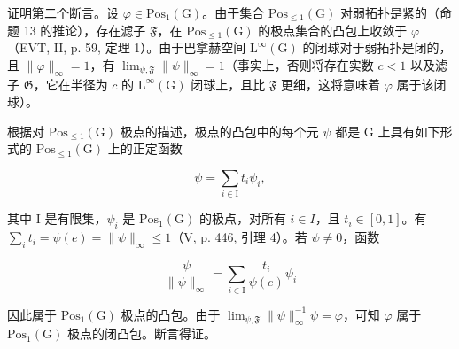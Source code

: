 证明第二个断言。设 \(\varphi\in\mathrm{Pos}_{1}(\mathrm{G})\)。由于集合 \(\mathrm{Pos}_{\leqslant 1}(\mathrm{G})\) 对弱拓扑是紧的（命题 13 的推论），存在滤子 \(\mathfrak{F}\)，在 \(\mathrm{Pos}_{\leqslant 1}(\mathrm{G})\) 的极点集合的凸包上收敛于 \(\varphi\)（EVT, II, p. 59, 定理 1）。由于巴拿赫空间 \(\mathrm{L}^{\infty}(\mathrm{G})\) 的闭球对于弱拓扑是闭的，且 \(\|\varphi\|_{\infty}=1\)，有 \(\lim_{\psi,\mathfrak{F}}\|\psi\|_{\infty}=1\)（事实上，否则将存在实数 \(c<1\) 以及滤子 \(\mathfrak{G}\)，它在半径为 \(c\) 的 \(\mathrm{L}^{\infty}(\mathrm{G})\) 闭球上，且比 \(\mathfrak{F}\) 更细，这将意味着 \(\varphi\) 属于该闭球）。

根据对 \(\mathrm{Pos}_{\leqslant1}(\mathrm{G})\) 极点的描述，极点的凸包中的每个元 \(\psi\) 都是 G 上具有如下形式的 \(\mathrm{Pos}_{\leqslant1}(\mathrm{G})\) 上的正定函数

\[
\psi = \sum_ {i \in \mathrm{I}} t _ {i} \psi_ {i},
\]

其中 I 是有限集，\(\psi_{i}\) 是 \(\mathrm{Pos}_{1}(\mathrm{G})\) 的极点，对所有 \(i \in I\)，且 \(t_{i} \in [0,1]\)。有 \(\sum_{i} t_{i} = \psi(e) = \|\psi\|_{\infty} \leqslant 1\)（V, p. 446, 引理 4）。若 \(\psi \neq 0\)，函数

\[
\frac {\psi}{\| \psi \| _ {\infty}} = \sum_ {i \in \mathrm{I}} \frac {t _ {i}}{\psi (e)} \psi_ {i}
\]

因此属于 \(\mathrm{Pos}_{1}(\mathrm{G})\) 极点的凸包。由于 \(\lim_{\psi,\mathfrak{F}}\|\psi\|_{\infty}^{-1}\psi=\varphi\)，可知 \(\varphi\) 属于 \(\mathrm{Pos}_{1}(\mathrm{G})\) 极点的闭凸包。断言得证。

